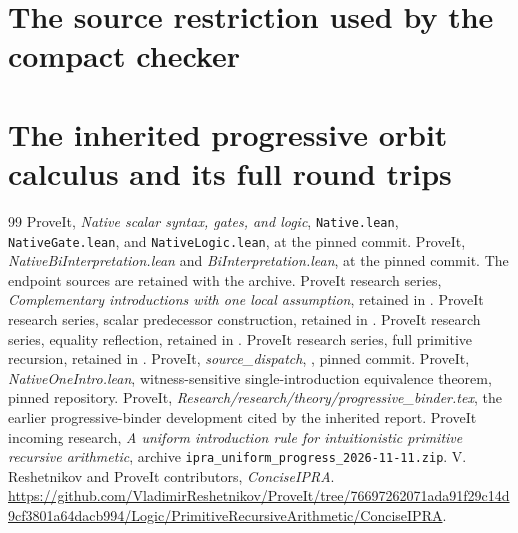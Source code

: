 \documentclass[11pt,a4paper]{article}
\theoremstyle{definition}\newtheorem{definition}[theorem]{Definition}
\begin{document}
\part{The source restriction used by the compact checker}

\clearpage
\part{The inherited progressive orbit calculus and its full round trips}



\begin{thebibliography}{99}
 ProveIt, \emph{Native scalar syntax, gates, and logic},
\texttt{Native.lean}, \texttt{NativeGate.lean}, and \texttt{NativeLogic.lean},
at the pinned commit.
 ProveIt, \emph{NativeBiInterpretation.lean} and
\emph{BiInterpretation.lean}, at the pinned commit. The endpoint sources
are retained with the archive.
 ProveIt research series, \emph{Complementary introductions
with one local assumption}, retained in
.
 ProveIt research series, scalar predecessor construction,
retained in .
 ProveIt research series, equality reflection,
retained in .
 ProveIt research series, full primitive recursion,
retained in .
 ProveIt, \emph{source\_dispatch},
, pinned commit.
 ProveIt, \emph{NativeOneIntro.lean}, witness-sensitive
single-introduction equivalence theorem, pinned repository.
 ProveIt, \emph{Research/research/theory/progressive\_binder.tex},
the earlier progressive-binder development cited by the inherited report.
 ProveIt incoming research, \emph{A uniform introduction
rule for intuitionistic primitive recursive arithmetic}, archive
\texttt{ipra\_uniform\_progress\_2026-11-11.zip}.
 V. Reshetnikov and ProveIt contributors, \emph{ConciseIPRA}.
\url{https://github.com/VladimirReshetnikov/ProveIt/tree/76697262071ada91f29c14d9cf3801a64dacb994/Logic/PrimitiveRecursiveArithmetic/ConciseIPRA}.
\end{thebibliography}
\end{document}
